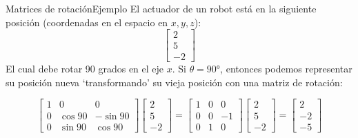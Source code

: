 \documentclass[spanish, c]{beamer}
\begin{document}
\begin{frame}{Matrices de rotación}{Ejemplo}
    El actuador de un robot está en la siguiente posición (coordenadas en el espacio en $x, y, z$):
    $$\begin{bmatrix}
        2 \\ 5 \\ -2
    \end{bmatrix}$$
    El cual debe rotar 90 grados en el eje $x$. Si $\theta = 90$°, entonces podemos representar su posición nueva `transformando' su vieja posición con una matriz de rotación:

    \bigskip

    $$\begin{bmatrix}
        1 & 0 & 0 \\
        0 & \cos 90 & -\sin 90 \\
        0 & \sin 90 & \cos 90
    \end{bmatrix} \begin{bmatrix}
        2 \\ 5 \\ -2
    \end{bmatrix} = \begin{bmatrix}
        1 & 0 & 0 \\
        0 & 0 & -1 \\
        0 & 1 & 0
    \end{bmatrix} \begin{bmatrix}
        2 \\ 5 \\ -2
    \end{bmatrix}
    = \begin{bmatrix}
        2 \\ -2 \\ -5
    \end{bmatrix}$$
\end{frame}




\end{document}
